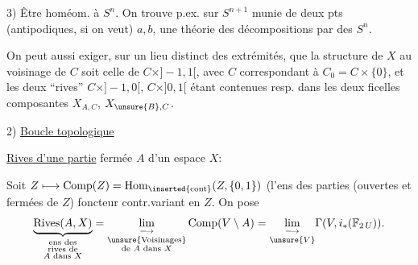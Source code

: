 

3) Être homéom. à $S^n$. On trouve p.ex. sur $S^{n+1}$ munie de deux pts  (antipodiques, si on veut) $a,b$, une théorie des  décompositions par des $S^n$.


On peut aussi exiger, sur un lieu distinct des extrémités, que la structure de $X$ au voisinage de $C$ soit celle de $C\times]-1,1[$, avec $C$ correspondant à $C_0=C\times\{0\}$, et les deux ``rives'' $C\times]-1,0[$, $C\times]0,1[$ étant contenues resp. dans les deux ficelles composantes $X_{A,C}$, $X_{\unsure{B},C}$.



2) \uline{Boucle topologique}

 \uline{Rives d'une partie} fermée $A$ d'un espace $X$: 

Soit $Z\longmapsto\operatorname{Comp}(Z)=\operatorname{Hom}_{\inserted{\mathrm{cont}}}(Z,\{0,1\})$ 
(l'ens des parties  (ouvertes et fermées de $Z$) foncteur contr.variant en $Z$. On pose
\[
\underbrace{\operatorname{Rives}(A,X)}_{\substack{\text{ens des}\\\text{rives de}\\A\text{ dans }X}}
=\underset{\substack{\text{\unsure{Voisinages}}\\\text{de }A\text{ dans }X}}{\lim_{\longrightarrow}}
\operatorname{Comp}(V\setminus A)
=\underset{\unsure{V}}{\lim_{\longrightarrow}}\Gamma(V,i_*(\mathbb F_{2\,U})).
\]


